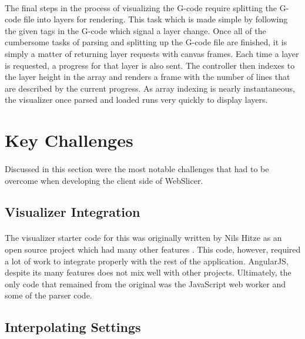 \paragraph{}
The final steps in the process of visualizing the G-code require splitting the G-code file into layers for rendering.
This task which is made simple by following the given tags in the G-code which signal a layer change.
Once all of the cumbersome tasks of parsing and splitting up the G-code file are finished, it is simply a matter of returning layer requests with canvas frames.
Each time a layer is requested, a progress for that layer is also sent.
The controller then indexes to the layer height in the array and renders a frame with the number of lines that are described by the current progress.
As array indexing is nearly instantaneous, the visualizer once parsed and loaded runs very quickly to display layers.

\section{Key Challenges}
\paragraph{}
Discussed in this section were the most notable challenges that had to be overcome when developing the client side of WebSlicer.

\subsection{Visualizer Integration}
\paragraph{}
The visualizer starter code for this was originally written by Nils Hitze as an open source project which had many other features \citep{hitzeViewer-2015}.
This code, however, required a lot of work to integrate properly with the rest of the application.
AngularJS, despite its many features does not mix well with other projects.
Ultimately, the only code that remained from the original was the JavaScript web worker and some of the parser code.

\subsection{Interpolating Settings}

